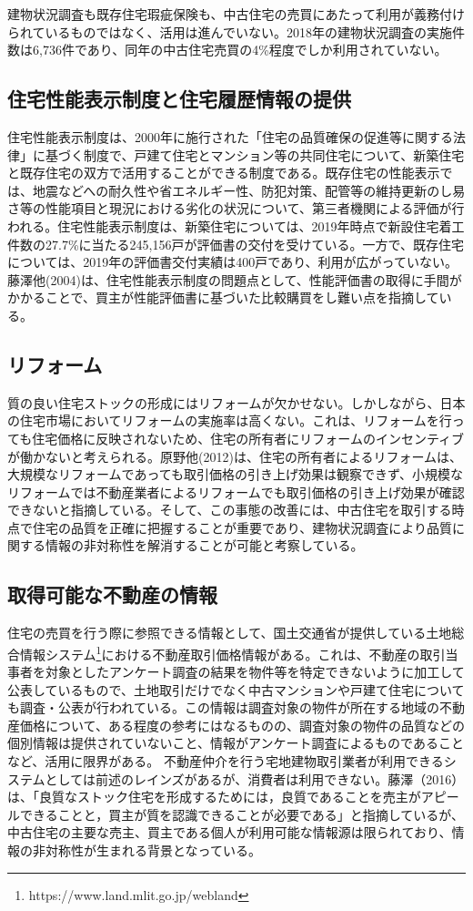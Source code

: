 \documentclass[a4paper,fontsize=11pt,report,notitlepage,line_length=38zw,number_of_lines=40,dvipdfmx]{jlreq}
\begin{document}
建物状況調査も既存住宅瑕疵保険も、中古住宅の売買にあたって利用が義務付けられているものではなく、活用は進んでいない。2018年の建物状況調査の実施件数は6,736件\cite{questionnaire}であり、同年の中古住宅売買の4\%程度でしか利用されていない。

\subsection{住宅性能表示制度と住宅履歴情報の提供}
住宅性能表示制度は、2000年に施行された「住宅の品質確保の促進等に関する法律」に基づく制度で、戸建て住宅とマンション等の共同住宅について、新築住宅と既存住宅の双方で活用することができる制度である。既存住宅の性能表示では、地震などへの耐久性や省エネルギー性、防犯対策、配管等の維持更新のし易さ等の性能項目と現況における劣化の状況について、第三者機関による評価が行われる。住宅性能表示制度は、新築住宅については、2019年時点で新設住宅着工件数の27.7\%に当たる245,156戸が評価書の交付を受けている。一方で、既存住宅については、2019年の評価書交付実績は400戸であり、利用が広がっていない\cite{jutakuseino}。藤澤他(2004)\cite{fujisawa2004}は、住宅性能表示制度の問題点として、性能評価書の取得に手間がかかることで、買主が性能評価書に基づいた比較購買をし難い点を指摘している。


\subsection{リフォーム}
質の良い住宅ストックの形成にはリフォームが欠かせない。しかしながら、日本の住宅市場においてリフォームの実施率は高くない。これは、リフォームを行っても住宅価格に反映されないため、住宅の所有者にリフォームのインセンティブが働かないと考えられる。原野他(2012)\cite{harano2013}は、住宅の所有者によるリフォームは、大規模なリフォームであっても取引価格の引き上げ効果は観察できず、小規模なリフォームでは不動産業者によるリフォームでも取引価格の引き上げ効果が確認できないと指摘している。そして、この事態の改善には、中古住宅を取引する時点で住宅の品質を正確に把握することが重要であり、建物状況調査により品質に関する情報の非対称性を解消することが可能と考察している。


\subsection{取得可能な不動産の情報}
住宅の売買を行う際に参照できる情報として、国土交通省が提供している土地総合情報システム\footnote{https://www.land.mlit.go.jp/webland}における不動産取引価格情報がある。これは、不動産の取引当事者を対象としたアンケート調査の結果を物件等を特定できないように加工して公表しているもので、土地取引だけでなく中古マンションや戸建て住宅についても調査・公表が行われている。この情報は調査対象の物件が所在する地域の不動産価格について、ある程度の参考にはなるものの、調査対象の物件の品質などの個別情報は提供されていないこと、情報がアンケート調査によるものであることなど、活用に限界がある。
不動産仲介を行う宅地建物取引業者が利用できるシステムとしては前述のレインズがあるが、消費者は利用できない。藤澤（2016）\cite{fujisawa2016}
は、「良質なストック住宅を形成するためには，良質であることを売主がアピールできることと，買主が質を認識できることが必要である」と指摘しているが、中古住宅の主要な売主、買主である個人が利用可能な情報源は限られており、情報の非対称性が生まれる背景となっている。
\end{document}
